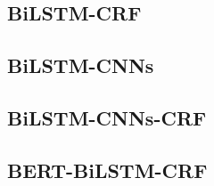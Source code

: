 \documentclass[a4paper,UTF8,no-math]{ctexart}
\begin{document}
	\subsection{BiLSTM-CRF}
	
	\citep{bilstm-crf}
	
	\subsection{BiLSTM-CNNs}
	
	\citep{chiu2016named}
	
	\subsection{BiLSTM-CNNs-CRF}
	
	\citep{ma2016end}

	\subsection{BERT-BiLSTM-CRF}
	
	\citep{devlin2018bert}
	
	\newpage
	
    
\end{document}
